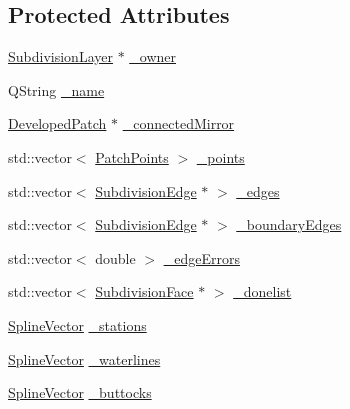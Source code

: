 \subsection*{Protected Attributes}
\begin{DoxyCompactItemize}
\item 
\hyperlink{classShipCAD_1_1SubdivisionLayer}{Subdivision\+Layer} $\ast$ \hyperlink{classShipCAD_1_1DevelopedPatch_a8ef2df371c3be810ceeabca4e0daf4b3}{\+\_\+owner}
\item 
Q\+String \hyperlink{classShipCAD_1_1DevelopedPatch_a0af8b4e9e1ee667c781fef6df56ca7d3}{\+\_\+name}
\item 
\hyperlink{classShipCAD_1_1DevelopedPatch}{Developed\+Patch} $\ast$ \hyperlink{classShipCAD_1_1DevelopedPatch_a425239fe90e8afd53ad126a1afdce42f}{\+\_\+connected\+Mirror}
\item 
std\+::vector$<$ \hyperlink{structShipCAD_1_1PatchPoints}{Patch\+Points} $>$ \hyperlink{classShipCAD_1_1DevelopedPatch_a0f6690447bc683f1ea4f4872e1309a3f}{\+\_\+points}
\item 
std\+::vector$<$ \hyperlink{classShipCAD_1_1SubdivisionEdge}{Subdivision\+Edge} $\ast$ $>$ \hyperlink{classShipCAD_1_1DevelopedPatch_a2c7e5cadc05bcf6a66992d7269a9971e}{\+\_\+edges}
\item 
std\+::vector$<$ \hyperlink{classShipCAD_1_1SubdivisionEdge}{Subdivision\+Edge} $\ast$ $>$ \hyperlink{classShipCAD_1_1DevelopedPatch_ae27386140a170f80afed4565202f522c}{\+\_\+boundary\+Edges}
\item 
std\+::vector$<$ double $>$ \hyperlink{classShipCAD_1_1DevelopedPatch_a997ac5cd92f3479d976f79a4da064d42}{\+\_\+edge\+Errors}
\item 
std\+::vector$<$ \hyperlink{classShipCAD_1_1SubdivisionFace}{Subdivision\+Face} $\ast$ $>$ \hyperlink{classShipCAD_1_1DevelopedPatch_a22be478eddc1140e6b800060c6ab513b}{\+\_\+donelist}
\item 
\hyperlink{namespaceShipCAD_a053b941b2c87049bb9380428d4d5a056}{Spline\+Vector} \hyperlink{classShipCAD_1_1DevelopedPatch_a61db759391d5f9d542dfe4551e2406ca}{\+\_\+stations}
\item 
\hyperlink{namespaceShipCAD_a053b941b2c87049bb9380428d4d5a056}{Spline\+Vector} \hyperlink{classShipCAD_1_1DevelopedPatch_a4708ff9dd3e334c0e774944d25b07947}{\+\_\+waterlines}
\item 
\hyperlink{namespaceShipCAD_a053b941b2c87049bb9380428d4d5a056}{Spline\+Vector} \hyperlink{classShipCAD_1_1DevelopedPatch_a22b335fdb32b04aab580fc1dd90e0481}{\+\_\+buttocks}
\item 

\end{DoxyCompactItemize}
